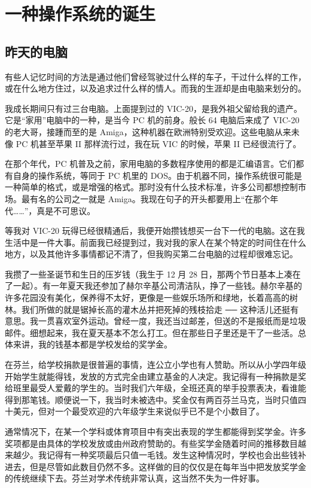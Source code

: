 \chapter{一种操作系统的诞生}
\section{昨天的电脑}

有些人记忆时间的方法是通过他们曾经驾驶过什么样的车子，干过什么样的工作，或在什么地方住过，以及追求过什么样的情人。而我的生涯却是由电脑来划分的。

我成长期间只有过三台电脑。上面提到过的 VIC-20，是我外祖父留给我的遗产。它是“家用”电脑中的一种，是当今 PC 机的前身。般长 64 电脑后来成了 VIC-20 的老大哥，接踵而至的是 Amiga，这种机器在欧洲特别受欢迎。这些电脑从来未像 PC 机甚至苹果 II 那样流行过，我在玩 VIC 的时候，苹果 II 已经很流行了。

在那个年代，PC 机普及之前，家用电脑的多数程序使用的都是汇编语言。它们都有自身的操作系统，等同于 PC 机里的 DOS。由于机器不同，操作系统很可能是一种简单的格式，或是增强的格式。那时没有什么技术标准，许多公司都想控制市场。最有名的公司之一就是 Amiga。我现在句子的开头都要用上“在那个年代……”，真是不可思议。

等我对 VIC-20 玩得已经很精通后，我便开始攒钱想买一台下一代的电脑。这在我生活中是一件大事。前面我已经提到过，我对我的家人在某个特定的时间住在什么地方，以及其他许多事情都记不清了，但我购买第二台电脑的过程却很难忘记。

我攒了一些圣诞节和生日的压岁钱（我生于 12 月 28 日，那两个节日基本上凑在了一起）。有一年夏天我还参加了赫尔辛基公司清洁队，挣了一些钱。赫尔辛基的许多花园没有美化，保养得不太好，更像是一些娱乐场所和绿地，长着高高的树林。我们所做的就是锯掉长高的灌木丛并把死掉的残枝拾走 ── 这种活儿还挺有意思。我一贯喜欢室外运动。曾经一度，我还当过邮差，但送的不是报纸而是垃圾邮件。细想起来，我在夏天基本不怎么打工。但在那些日子里还是干了一些活。总体来讲，我的钱基本都是学校发给的奖学金。

在芬兰，给学校捐款是很普遍的事情，连公立小学也有人赞助。所以从小学四年级开始学生就能得钱，发放的方式完全由建立基金的人决定。我记得有一种捐款是奖给班里最受人爱戴的学生的。当时我们六年级，全班还真的举手投票表决，看谁能得到那笔钱。顺便说一下，我当时未被选中。奖金仅有两百芬兰马克，当时只值四十美元，但对一个最受欢迎的六年级学生来说似乎已不是个小数目了。

通常情况下，在某一个学科或体育项目中有突出表现的学生都能得到奖学金。许多奖项都是由具体的学校发放或由州政府赞助的。有些奖学金随着时间的推移数目越来越少。我记得有一种奖项最后只值一毛钱。发生这种情况时，学校也会出些钱补进去，但是尽管如此数目仍然不多。这样做的目的仅仅是在每年当中把发放奖学金的传统继续下去。芬兰对学术传统非常认真，这当然不失为一件好事。

